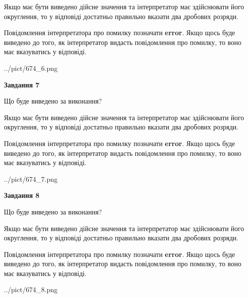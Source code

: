 \documentclass[12pt, ukrainian]{article}
\begin{document}
{\begin {Large}
Якщо має бути виведено дійсне значення та інтерпретатор має здійснювати його округлення, 
то у відповіді достатньо правильно вказати два дробових розряди.

Повідомлення інтерпретатора про помилку позначати \textbf{error}.
Якщо щось буде виведено до того, як інтерпретатор видасть повідомлення про помилку, 
то воно має вказуватись у відповіді. \par

\begin{center}
	{../pict/674_6.png}
\end{center}
\newpage

{\begin {center}\textbf{Завдання 7}\end {center}}\par
Що буде виведено за виконання? \par

Якщо має бути виведено дійсне значення та інтерпретатор має здійснювати його округлення, 
то у відповіді достатньо правильно вказати два дробових розряди.

Повідомлення інтерпретатора про помилку позначати \textbf{error}.
Якщо щось буде виведено до того, як інтерпретатор видасть повідомлення про помилку, 
то воно має вказуватись у відповіді. \par

\begin{center}
	{../pict/674_7.png}
\end{center}
\newpage

{\begin {center}\textbf{Завдання 8}\end {center}}\par
Що буде виведено за виконання? \par

Якщо має бути виведено дійсне значення та інтерпретатор має здійснювати його округлення, 
то у відповіді достатньо правильно вказати два дробових розряди.

Повідомлення інтерпретатора про помилку позначати \textbf{error}.
Якщо щось буде виведено до того, як інтерпретатор видасть повідомлення про помилку, 
то воно має вказуватись у відповіді. \par

\begin{center}
	{../pict/674_8.png}
\end{center}
\newpage


\end{Large}}
\end{document}
